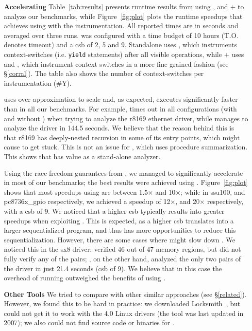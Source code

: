\noindent\textbf{Accelerating \corral }
%
Table~\ref{tab:results} presents runtime results from using \whoop, \corral and \whoop + \corral to analyze our benchmarks, while Figure~\ref{fig:plot} plots the runtime speedups that \corral achieves using \whoop with the \yieldmr instrumentation. All reported times are in seconds and averaged over three runs. \corral was configured with a time budget of 10 hours (T.O. denotes timeout) and a csb of 2, 5 and 9. Standalone \corral uses \yieldall, which instruments context-switches (i.e. \texttt{yield} statements) after all visible operations, while \whoop + \corral uses \yieldcoarse and \yieldmr, which instrument context-switches in a more fine-grained fashion (see \S\ref{corral}). The table also shows the number of context-switches per instrumentation (\#Y).

\whoop uses over-approximation to scale and, as expected, executes significantly faster than \corral in all our benchmarks. For example, \corral times out in all configurations (with and without \whoop) when trying to analyze the r8169 ethernet driver, while \whoop manages to analyze the driver in 144.5 seconds. We believe that the reason behind this is that r8169 has deeply-nested recursion in some of its entry points, which might cause \corral to get stuck. This is not an issue for \whoop, which uses procedure summarization. This shows that \whoop has value as a stand-alone analyzer.

Using the race-freedom guarantees from \whoop, we managed to significantly accelerate \corral in most of our benchmarks; the best results were achieved using \yieldmr. Figure~\ref{fig:plot} shows that most speedups using \yieldmr are between 1.5$\times$ and 10$\times$; while in ssu100, and pc8736x\_gpio respectively, we achieved a speedup of 12$\times$, and 20$\times$ respectively, with a csb of 9. We noticed that a higher csb typically results into greater speedups when exploiting \whoop. This is expected, as a higher csb translates into a larger sequentialized program, and thus \whoop has more opportunities to reduce this sequentialization.
%
However, there are some cases where \whoop might slow down \corral. We noticed this in the sx8 driver: \whoop verified 46 out of 47 memory regions, but did not fully verify any of the pairs; \corral, on the other hand, analyzed the only two pairs of the driver in just 21.4 seconds (csb of 9). We believe that in this case the overhead of running \whoop outweighed the benefits of using \yieldmr.

\noindent\textbf{Other Tools }
%
We tried to compare \whoop with other similar approaches (see \S\ref{related}). However, we found this to be hard in practice: we downloaded Locksmith~\cite{pratikakis2006locksmith}, but could not get it to work with the 4.0 Linux drivers (the tool was last updated in 2007); we also could not find source code or binaries for \cite{kahlon2007fast, kahlon2009semantic, das2015section}.
